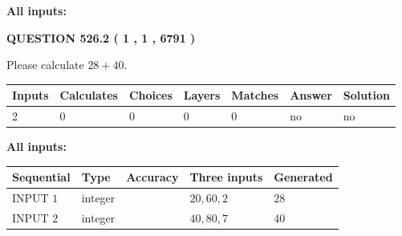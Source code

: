 \documentclass[12pt]{article}
\begin{document}
   
   
   
\noindent{}
   
   
   
   
\noindent\vspace{0.1in}\hspace{-0.08in} {\textbf{\Large{All inputs: }}}
   
   
  
\vspace{0.2in}
  
{\textbf{\Large{QUESTION
526.2 
 ( 1 , 1 , 6791 )
}}}
  
  
 
Please calculate $ %
28 +  %
40 $.
 
 
   
   
   
   
\noindent\begin{tabular}{|l|l|l|l|l|l|l|}
 \hline
Inputs & Calculates & Choices & Layers & Matches & Answer & Solution \\ \hline
 2  & 
 0  & 
 0
  & 
 0  & 
 0  & 
  no & 
  no 
  \\ \hline
 \end{tabular}
   
   
   
   
\noindent{}
   
   
   
   
\noindent\vspace{0.1in}\hspace{-0.08in} {\textbf{\Large{All inputs: }}}
   
   
  
  
\noindent\begin{tabular}{|l|l|l|l|l|}
\hline
 Sequential & Type & Accuracy & Three inputs & Generated \\ 
\hline
 
 
  INPUT $  1 $ & integer &  & $
 20
 , 
 60
 , 
 2
 $ & $ 28 $ 
 \\  \hline  
 
 
  INPUT $  2 $ & integer &  & $
 40
 , 
 80
 , 
 7
 $ & $ 40 $ 
 \\  \hline  
 \end{tabular}
   
   
   
   
   
   
 \vspace{0.2in}
 
\end{document}
